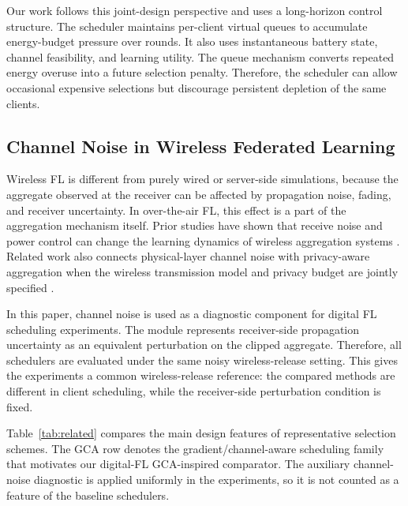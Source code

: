 \documentclass[journal]{IEEEtran}
\begin{document}
Our work follows this joint-design perspective and uses a long-horizon control structure. The scheduler maintains per-client virtual queues to accumulate energy-budget pressure over rounds. It also uses instantaneous battery state, channel feasibility, and learning utility. The queue mechanism converts repeated energy overuse into a future selection penalty. Therefore, the scheduler can allow occasional expensive selections but discourage persistent depletion of the same clients.

\subsection{Channel Noise in Wireless Federated Learning}

Wireless FL is different from purely wired or server-side simulations, because the aggregate observed at the receiver can be affected by propagation noise, fading, and receiver uncertainty. In over-the-air FL, this effect is a part of the aggregation mechanism itself. Prior studies have shown that receive noise and power control can change the learning dynamics of wireless aggregation systems \cite{yang2020otafl,amiri2020machine,zhu2020broadband,amiri2021updateaware}. Related work also connects physical-layer channel noise with privacy-aware aggregation when the wireless transmission model and privacy budget are jointly specified \cite{yan2023otafedavgprivacy}.

In this paper, channel noise is used as a diagnostic component for digital FL scheduling experiments. The module represents receiver-side propagation uncertainty as an equivalent perturbation on the clipped aggregate. Therefore, all schedulers are evaluated under the same noisy wireless-release setting. This gives the experiments a common wireless-release reference: the compared methods are different in client scheduling, while the receiver-side perturbation condition is fixed.

Table~\ref{tab:related} compares the main design features of representative selection schemes. The GCA row denotes the gradient/channel-aware scheduling family that motivates our digital-FL GCA-inspired comparator. The auxiliary channel-noise diagnostic is applied uniformly in the experiments, so it is not counted as a feature of the baseline schedulers.
\end{document}
